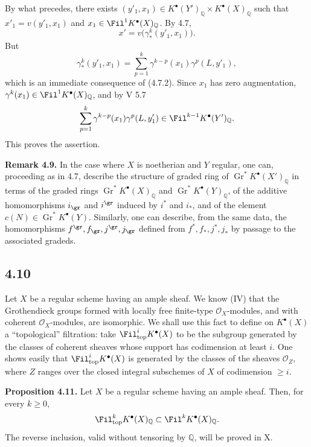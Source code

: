 By what precedes, there exists \((y'_1,x_1)\in K^\bullet(Y')_{\mathbb Q}\times K^\bullet(X)_{\mathbb Q}\) such that \(x'_1=v(y'_1,x_1)\) and \(x_1\in\Fil^1K^\bullet(X)_{\mathbb Q}\). By 4.7,
\[
  x'=v\bigl(\gamma^k_*(y'_1,x_1)\bigr).
\]
But
\[
  \gamma^k_*(y'_1,x_1)
  =
  \sum_{p=1}^{k}\gamma^{k-p}(x_1)\gamma^p(L,y'_1),
\]
which is an immediate consequence of (4.7.2). Since \(x_1\) has zero augmentation, \(\gamma^k(x_1)\in\Fil^1K^\bullet(X)_{\mathbb Q}\), and by V 5.7
\[
  \sum_{p=1}^{k}\gamma^{k-p}(x_1)\gamma^p(L,y'_1)
  \in\Fil^{k-1}K^\bullet(Y')_{\mathbb Q}.
\]
This proves the assertion.

\textbf{Remark 4.9.} In the case where \(X\) is noetherian and \(Y\) regular, one can, proceeding as in 4.7, describe the structure of graded ring of \(\operatorname{Gr}^*K^\bullet(X')_{\mathbb Q}\) in terms of the graded rings \(\operatorname{Gr}^*K^\bullet(X)_{\mathbb Q}\) and \(\operatorname{Gr}^*K^\bullet(Y)_{\mathbb Q}\), of the additive homomorphisms \(i_{\gr}\) and \(i^{\gr}\) induced by \(i^*\) and \(i_*\), and of the element \(c(N)\in\operatorname{Gr}^*K^\bullet(Y)\). Similarly, one can describe, from the same data, the homomorphisms \(f^{\gr}, f_{\gr}, j^{\gr}, j_{\gr}\) defined from \(f^*, f_*, j^*, j_*\) by passage to the associated gradeds.

\subsection*{4.10}

Let \(X\) be a regular scheme having an ample sheaf. We know (IV) that the Grothendieck groups formed with locally free finite-type \(\mathcal O_X\)-modules, and with coherent \(\mathcal O_X\)-modules, are isomorphic. We shall use this fact to define on \(K^\bullet(X)\) a ``topological'' filtration: take \(\Fil_{\mathrm{top}}^iK^\bullet(X)\) to be the subgroup generated by the classes of coherent sheaves whose support has codimension at least \(i\). One shows easily that \(\Fil_{\mathrm{top}}^iK^\bullet(X)\) is generated by the classes of the sheaves \(\mathcal O_Z\), where \(Z\) ranges over the closed integral subschemes of \(X\) of codimension \(\ge i\).

\textbf{Proposition 4.11.} Let \(X\) be a regular scheme having an ample sheaf. Then, for every \(k\ge0\),
\[
  \Fil_{\mathrm{top}}^kK^\bullet(X)_{\mathbb Q}
  \subset
  \Fil^kK^\bullet(X)_{\mathbb Q}.
\]
The reverse inclusion, valid without tensoring by \(\mathbb Q\), will be proved in X.

